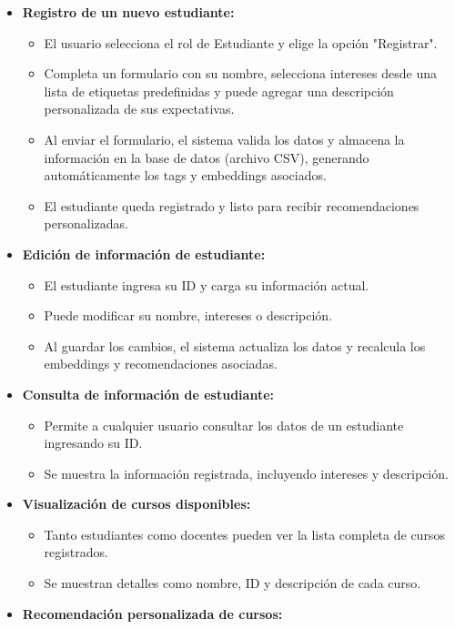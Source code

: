 \documentclass[12pt]{article}
\begin{document}
\begin{itemize}
    \item \textbf{Registro de un nuevo estudiante:}
    \begin{itemize}
        \item El usuario selecciona el rol de Estudiante y elige la opción "Registrar".
        \item Completa un formulario con su nombre, selecciona intereses desde una lista de etiquetas predefinidas y puede agregar una descripción personalizada de sus expectativas.
        \item Al enviar el formulario, el sistema valida los datos y almacena la información en la base de datos (archivo CSV), generando automáticamente los tags y embeddings asociados.
        \item El estudiante queda registrado y listo para recibir recomendaciones personalizadas.
    \end{itemize}
    \item \textbf{Edición de información de estudiante:}
    \begin{itemize}
        \item El estudiante ingresa su ID y carga su información actual.
        \item Puede modificar su nombre, intereses o descripción.
        \item Al guardar los cambios, el sistema actualiza los datos y recalcula los embeddings y recomendaciones asociadas.
    \end{itemize}
    \item \textbf{Consulta de información de estudiante:}
    \begin{itemize}
        \item Permite a cualquier usuario consultar los datos de un estudiante ingresando su ID.
        \item Se muestra la información registrada, incluyendo intereses y descripción.
    \end{itemize}
    \item \textbf{Visualización de cursos disponibles:}
    \begin{itemize}
        \item Tanto estudiantes como docentes pueden ver la lista completa de cursos registrados.
        \item Se muestran detalles como nombre, ID y descripción de cada curso.
    \end{itemize}
    \item \textbf{Recomendación personalizada de cursos:}

\end{itemize}
\end{document}
